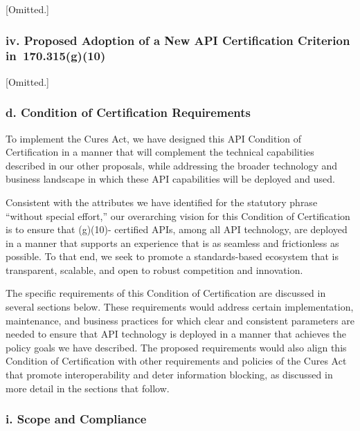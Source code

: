 \documentclass[twoside,11pt]{article}
\begin{document}
[Omitted.]


          \subsubsection{iv. Proposed Adoption of a New API Certification Criterion in \textsection{} 170.315(g)(10)}

[Omitted.]

          \subsubsection{d. Condition of Certification Requirements}

          To implement the Cures Act, we have designed this API Condition of Certification in a manner that will complement the technical capabilities described in our other proposals, while addressing the broader technology and business landscape in which these API capabilities will be deployed and used.



          Consistent with the attributes we have identified for the statutory phrase “without special effort,” our overarching vision for this Condition of Certification is to ensure that (g)(10)- certified APIs, among all API  \ifhmode\expandafter\xspace\fi technology, are deployed in a manner that supports an experience that is as seamless and frictionless as possible. To that end, we seek to promote a standards-based ecosystem that is transparent, scalable, and open to robust competition and innovation.


          The specific requirements of this Condition of Certification are discussed in several sections below. These requirements would address certain implementation, maintenance, and business practices for which clear and consistent parameters are needed to ensure that API technology is deployed in a manner that achieves the policy goals we have described. The proposed requirements would also align this Condition of Certification with other requirements and policies of the Cures Act that promote interoperability and deter information blocking, as discussed in more detail in the sections that follow.


          \subsubsection{i. Scope and Compliance}
\end{document}
